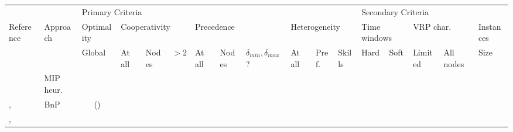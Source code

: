 \begin{sidewaystable}
	\tableConfig
	\setlength{\tabcolsep}{4pt}
	\begin{tabular*}{\textwidth}{@{\extracolsep{\fill}}llccccccccccccccl}
		\toprule
		\multicolumn{2}{l}{} 					&
		\multicolumn{10}{l}{Primary Criteria} 	&
		\multicolumn{5}{l}{Secondary Criteria} 	\\
		\cmidrule(rl){3-12} \cmidrule(rl){13-17}
		\multicolumn{1}{l}{Reference} 			&
		\multicolumn{1}{l}{Approach} 			&
		\multicolumn{1}{l}{Optimality} 	&
		\multicolumn{3}{l}{Cooperativity} 		&
		\multicolumn{3}{l}{Precedence} 			&
		\multicolumn{3}{l}{Heterogeneity} 		&
		\multicolumn{2}{l}{Time windows} 		&
		\multicolumn{2}{l}{VRP char.} 			&
		\multicolumn{1}{l}{Instances} 		\\
		\cmidrule(rl){3-3} \cmidrule(rl){4-6} \cmidrule(rl){7-9} \cmidrule(rl){10-12} \cmidrule(rl){13-14} \cmidrule(rl){15-16} \cmidrule(rl){17-17}
		\multicolumn{2}{l}{}					&
		\multicolumn{1}{l}{Global} &
		\multicolumn{1}{l}{At all} &
		\multicolumn{1}{l}{Nodes} &
		\multicolumn{1}{l}{$>2$} &
		\multicolumn{1}{l}{At all} &
		\multicolumn{1}{l}{Nodes} &
		\multicolumn{1}{l}{$\delta_{min},\delta_{max}$?} &
		\multicolumn{1}{l}{At all} &
		\multicolumn{1}{l}{Pref.} &
		\multicolumn{1}{l}{Skills} &
		\multicolumn{1}{l}{Hard} &
		\multicolumn{1}{l}{Soft} &
		\multicolumn{1}{l}{Limited} &
		\multicolumn{1}{l}{All nodes} &
		\multicolumn{1}{l}{Size} \\
		\midrule
		\cite{bredstromCombinedVehicleRouting2008a} & 
			MIP heur. & 
			\nop & 
			\yes & \yes & \yes & 
			\yes & \yes & \yes & 
			\yes & \yes & \nop & 
			\yes & \yes & 
			\yes & \yes & 
			\instanceMedium \\ \sep
		\cite{rasmussenHomeCareCrew2012} & 
			BnP & 
			(\yes) & 
			\yes & \yes & \yes & 
			\yes & \yes & \yes & 
			\yes & \yes & \yes & 
			\yes & \nop & 
			\yes & \nop &
			\instanceLarge \\ \sep

\end{tabular*}
\end{sidewaystable}
